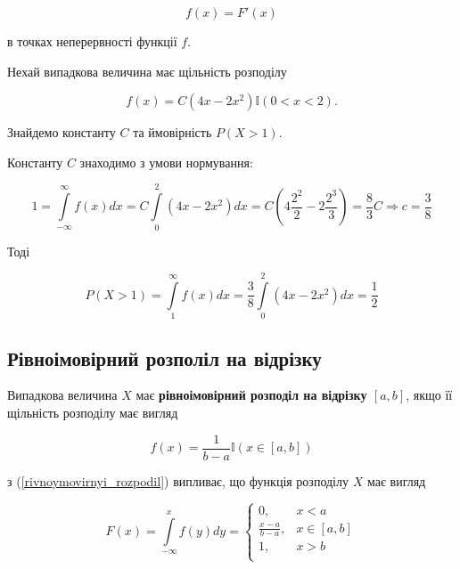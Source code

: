 \begin{equation}
    f(x) = F'(x)
\end{equation}

в точках неперервності функції $f$.

\begin{example}
    Нехай випадкова величина має щільність розподілу
    
    $$f(x) = C (4x -2x^2)\mathbb{I}(0 < x < 2).$$
    
    Знайдемо константу $C$ та ймовірність $P(X > 1)$.
    
    Константу $C$ знаходимо з умови нормування:
    
    $$1 = \int\limits_{-\infty}^{\infty} f(x) dx
    = C \int\limits_{0}^{2} (4x -2x^2) dx
    = C (4 \frac{2^2}{2} - 2 \frac{2^3}{3})
    = \frac{8}{3} C \Rightarrow c = \frac{3}{8}$$
    
    Тоді

    $$P(X > 1) = \int\limits_{1}^{\infty} f(x) dx
    = \frac{3}{8} \int\limits_{0}^{2} (4x -2x^2) dx
    = \frac{1}{2}$$
\end{example}

\subsection{Рівноімовірний розполіл на відрізку}

\begin{definition}
    
\end{definition}
Випадкова величина $X$ має \textbf{рівноімовірний розподіл на відрізку $[a, b]$},
якщо її щільність розподілу має вигляд

\begin{equation}
    \label{rivnoymovirnyi_rozpodil}
    f(x) = \frac{1}{b-a} \mathbb{I}(x \in [a, b])
\end{equation}

з (\ref{rivnoymovirnyi_rozpodil}) випливає, що функція розподілу $X$ має вигляд

\begin{equation}
    F(x) = \int\limits_{-\infty}^{x} f(y) dy
    = \left\{\begin{array}{ll}
        0, & x < a \\
        \frac{x-a}{b-a}, & x \in [a, b] \\
        1, & x > b \\
    \end{array}\right.
\end{equation}

